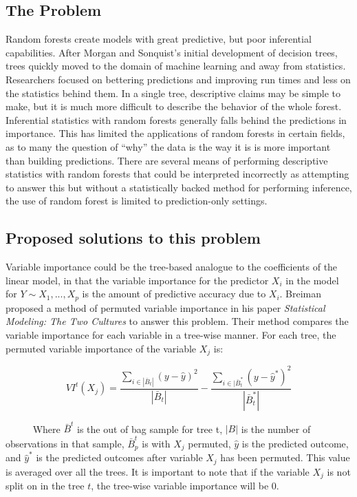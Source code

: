 \documentclass[12pt,twoside]{reedthesis}
\begin{document}
  \subsection{The Problem}\label{the-problem}
  
  Random forests create models with great predictive, but poor inferential
  capabilities. After Morgan and Sonquist's initial development of
  decision trees, trees quickly moved to the domain of machine learning
  and away from statistics. Researchers focused on bettering predictions
  and improving run times and less on the statistics behind them. In a
  single tree, descriptive claims may be simple to make, but it is much
  more difficult to describe the behavior of the whole forest. Inferential
  statistics with random forests generally falls behind the predictions in
  importance. This has limited the applications of random forests in
  certain fields, as to many the question of ``why'' the data is the way
  it is is more important than building predictions. There are several
  means of performing descriptive statistics with random forests that
  could be interpreted incorrectly as attempting to answer this but
  without a statistically backed method for performing inference, the use
  of random forest is limited to prediction-only settings.
  
  \subsection{Proposed solutions to this
  problem}\label{proposed-solutions-to-this-problem}
  
  Variable importance could be the tree-based analogue to the coefficients
  of the linear model, in that the variable importance for the predictor
  \(X_i\) in the model for \(Y \sim X_1,...,X_p\) is the amount of
  predictive accuracy due to \(X_i\). Breiman proposed a method of
  permuted variable importance in his paper \emph{Statistical Modeling:
  The Two Cultures} to answer this problem. Their method compares the
  variable importance for each variable in a tree-wise manner. For each
  tree, the permuted variable importance of the variable \(X_j\) is:
  
  \[VI^t(X_j) = \frac{\sum_{i \in |\bar{B}_t|} ({y} - \hat{y})^2}{|\bar{B}_t|} - \frac{\sum_{i \in |\bar{B}_t^*} ({y} - \hat{y}^*)^2}{|\bar{B}_t^*|} \]
  
  ~~~~~ Where \(\bar{B}^t\) is the out of bag sample for tree t, \(|B|\)
  is the number of observations in that sample, \(\bar{B}_p^t\) is with
  \(X_j\) permuted, \(\hat{y}\) is the predicted outcome, and
  \(\hat{y}^*\) is the predicted outcomes after variable \(X_j\) has been
  permuted. This value is averaged over all the trees. It is important to
  note that if the variable \(X_j\) is not split on in the tree \(t\), the
  tree-wise variable importance will be 0.
  
\end{document}
